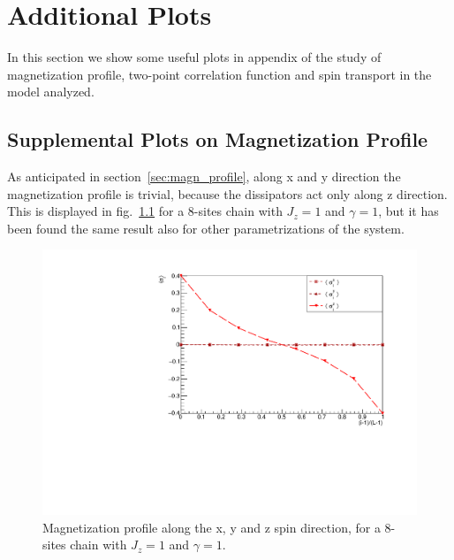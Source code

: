 \chapter{Additional Plots}
\label{appendix_supplemental}

In this section we show some useful plots in appendix of the study of magnetization profile, two-point correlation function and spin transport in the model analyzed.

\section{Supplemental Plots on Magnetization Profile}

As anticipated in section~\ref{sec:magn_profile}, along x and y direction the magnetization profile is trivial, because the dissipators act only along z direction. This is displayed in fig.~\ref{fig:comparisonSigmaXYZ} for a 8-sites chain with $J_z = 1$ and $\gamma = 1$, but it has been found the same result also for other parametrizations of the system.

\begin{figure}[H]
    \centering
    \captionsetup{width=1.\linewidth}
    \includegraphics[scale=0.6]{Figures/comparisonSigmaXYZ.pdf}
    \caption{Magnetization profile along the x, y and z spin direction, for a 8-sites chain with $J_z = 1$ and $\gamma = 1$.}
    \label{fig:comparisonSigmaXYZ}
\end{figure}

